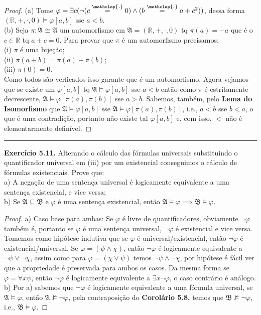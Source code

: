 \documentclass[11pt]{article}
\newcommand{\mf}[1]{\mathfrak{#1}}
\newcommand{\mbb}[1]{\mathbb{#1}}
\newcommand\overtext[2]{\stackrel{\mathclap{\normalfont\mbox{#1}}}{#2}}
\begin{document}
\begin{proof}
    (a) Tome $\varphi=\exists c(\neg(c\overtext{.}{=}0)\wedge(b\overtext{.}{=}a+c^2))$, dessa forma $(\mbb{R},+,\cdot,0)\vDash\varphi[a,b]$ sse $a<b$.\\
    (b) Seja $\pi:\mf{A}\cong\mf{A}$ um automorfismo em $\mf{A}=(\mbb{R},+,\cdot,0)$ tq $\pi(a) = -a$ que é o $c\in\mbb{R}$ tq $a+c=0$. Para provar que $\pi$ é um automorfismo precisamos:\\
    (i) $\pi$ é uma bijeção;\\
    (ii) $\pi(a+b)=\pi(a)+\pi(b)$;\\
    (iii) $\pi(0)=0$.\\
    Como todos são verficados isso garante que é um automorfismo. Agora vejamos que se existe um $\varphi[a,b]$ tq $\mf{A}\vDash\varphi[a,b]$ sse $a<b$ então como $\pi$ é estritamente decrescente, $\mf{A}\vDash\varphi[\pi(a),\pi(b)]$ sse $a>b$. Sabemos, também, pelo \textbf{Lema do Isomorfismo} que $\mf{A}\vDash\varphi[a,b]$ sse $\mf{A}\vDash\varphi[\pi(a),\pi(b)]$, i.e., $a<b$ sse $b<a$, o que é uma contradição, portanto não existe tal $\varphi[a,b]$ e, com isso, $<$ não é elementarmente definível.
\end{proof}

\hrule

\begin{shaded}
\textbf{Exercício 5.11.} Alterando o cálculo das fórmulas universais substituindo o quantificador universal em (iii) por um existencial conseguimos o cálculo de fórmulas existenciais. Prove que: \\
a) A negação de uma sentença universal é logicamente equivalente a uma sentença existencial, e vice versa;\\
b) Se $\mf{A}\subseteq\mf{B}$ e $\varphi$ é uma sentença existencial, então $\mf{A}\vDash\varphi\implies\mf{B}\vDash\varphi$.
\end{shaded}

\begin{proof}
    a) Caso base para ambas: Se $\varphi$ é livre de quantificadores, obviamente $\neg\varphi$ também é, portanto se $\varphi$ é uma sentença universal, $\neg\varphi$ é existencial e vice versa. Tomemos como hipótese indutiva que se $\varphi$ é universal/existencial, então $\neg\varphi$ é existencial/universal. Se $\varphi=(\psi\wedge\chi)$, então $\neg\varphi$ é logicamente equivalente a $\neg\psi\vee\neg\chi$, assim como para $\varphi=(\chi\vee\psi)$ temos $\neg\psi\wedge\neg\chi$, por hipótese é fácil ver que a propriedade é preservada para ambos os casos. Da mesma forma se $\varphi=\forall x\psi$, então $\neg\varphi$ é logicamente equivalente a $\exists x\neg\varphi$, o caso contrário é análogo.\\
    b) Por a) sabemos que $\neg\varphi$ é logicamente equivalente a uma fórmula universal, se $\mf{A}\vDash\varphi$, então $\mf{A}\nvDash\neg\varphi$, pela contraposição do \textbf{Corolário 5.8.} temos que $\mf{B}\nvDash\neg\varphi$, i.e., $\mf{B}\vDash\varphi$.
\end{proof}
\end{document}
